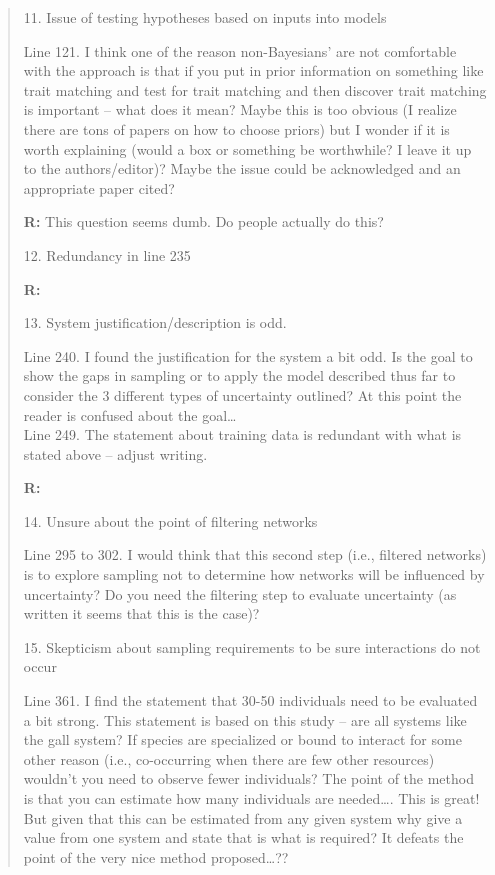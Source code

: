 \documentclass[12pt]{letter}
\newenvironment{refquote}{\bigskip \begin{it}}{\end{it}\smallskip}
\begin{document}
\begin{quotation}
		11. Issue of testing hypotheses based on inputs into models

		\begin{refquote}
		Line 121.  I think one of the reason non-Bayesians’ are not comfortable with the approach is that if you put in prior information on something like trait matching and test for trait matching and then discover trait matching is important – what does it mean?  Maybe this is too obvious (I realize there are tons of papers on how to choose priors) but I wonder if it is worth explaining (would a box or something be worthwhile?  I leave it up to the authors/editor)?  Maybe the issue could be acknowledged and an appropriate paper cited?
		\end{refquote}

		\textbf{R:} This question seems dumb. Do people actually do this?

		12. Redundancy in line 235

		\textbf{R:}

		13. System justification/description is odd.

		\begin{refquote}
		Line 240.  I found the justification for the system a bit odd.  Is the goal to show the gaps in sampling or to apply the model described thus far to consider the 3 different types of uncertainty outlined?  At this point the reader is confused about the goal… \\
		Line 249.  The statement about training data is redundant with what is stated above – adjust writing.
		\end{refquote}

		\textbf{R:}

		14. Unsure about the point of filtering networks

		\begin{refquote}
		Line 295 to 302.  I would think that this second step (i.e., filtered networks) is to explore sampling not to determine how networks will be influenced by uncertainty?  Do you need the filtering step to evaluate uncertainty (as written it seems that this is the case)?
		\end{refquote}

		15. Skepticism about sampling requirements to be sure interactions do not occur

		\begin{refquote}
		Line 361.  I find the statement that 30-50 individuals need to be evaluated a bit strong.  This statement is based on this study – are all systems like the gall system?  If species are specialized or bound to interact for some other reason (i.e., co-occurring when there are few other resources) wouldn’t you need to observe fewer individuals?  The point of the method is that you can estimate how many individuals are needed…. This is great!  But given that this can be estimated from any given system why give a value from one system and state that is what is required?  It defeats the point of the very nice method proposed…??
		\end{refquote}


\end{quotation}
\end{document}
